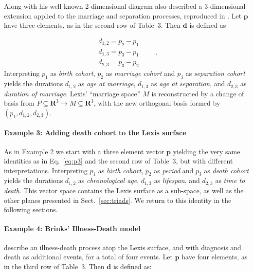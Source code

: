 \documentclass{bmcart}
\theoremstyle{definition}
\begin{document}
Along with his well known 2-dimensional diagram \citet{lexis1875einleitung} also
described a 3-dimensional extension applied to the marriage and
separation processes, reproduced in \citet{keiding2006event}. Let $\boldsymbol{p}$ have three elements, as in the second row of
Table~3. Then $\boldsymbol{d}$ is defined as

\begin{equation}
\label{eq:p3}
\begin{matrix}
d_{1,2} = p_2 - p_1\\
d_{1,3} = p_3 - p_1\\
d_{2,3} = p_3 - p_2
\end{matrix} \quad\quad.
\end{equation}
%
Interpreting $p_1$ as \textit{birth cohort}, $p_2$ as \textit{marriage cohort} and $p_3$ as
\textit{separation cohort} yields the durations $d_{1,2}$ as \textit{age at
marriage}, $d_{1,3}$ as \textit{age at separation}, and $d_{2,3}$ as
\textit{duration of marriage}. Lexis' ``marriage space'' $M$ is reconstructed by
a change of basis from $P\subseteq\mathbf{R}^3\to M\subseteq\mathbf{R}^3$, with
the new orthogonal basis formed by $(p_1, d_{1,2}, d_{2,3})$.

\paragraph{Example 3: Adding death cohort to the Lexis surface}

As in Example 2 we start with a three element vector
$\boldsymbol{p}$ yielding the very same identities as in Eq.~\eqref{eq:p3} and the second row of Table~3, but with different interpretations.
Interpreting $p_1$ as \textit{birth cohort}, $p_2$ as \textit{period} and $p_3$
as \textit{death cohort} yields the durations $d_{1,2}$ as \textit{chronological
age}, $d_{1,3}$ as \textit{lifespan}, and $d_{2,3}$ as \textit{time to death}.
This vector space contains the Lexis surface as a sub-space, as well as the other planes presented in Sect.~\ref{sec:triads}. We return to this identity
in the following sections.

\paragraph{Example 4: Brinks' Illness-Death model}

\citet{brinks2014lexis} describe an illness-death process atop the Lexis
surface, and with diagnosis and death as additional events, for a total of four
events. Let $\boldsymbol{p}$ have four elements, as in the third row of
Table~3. Then $\boldsymbol{d}$ is defined as:
\end{document}

